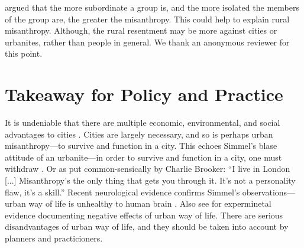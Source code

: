 \documentclass[11pt, letterpaper]{article}
\begin{document}
\begin{spacing}{1.4}
{
\citet{smith97} argued that the more subordinate a group is, and the more
isolated the members of the group are, the greater the misanthropy. %
 This could help to explain rural misanthropy.  Although, the rural resentment may be more against
  cities or urbanites, rather than people in general. We thank an anonymous reviewer for this point. %
}





\section*{Takeaway for Policy and Practice}

It is undeniable that there are multiple economic, environmental, and social
advantages to cities%
. 
 Cities are largely
 necessary, and so is perhaps urban misanthropy---to survive and function in a city.
 This echoes Simmel's blase attitude of an urbanite---in order to survive and function in a
 city, one must withdraw \citep{simmel03}. Or as put common-sensically by Charlie Brooker:
 ``I live in London [...] Misanthropy's the only thing that gets you
  through it. It's not a personality flaw, it's a skill.''
 Recent neurological evidence confirms
 Simmel's observations---urban way of life is unhealthy to human brain
 \citep{lederbogen11}. Also see \citet{milgram70} for experminetal evidence
 documenting negative effects of urban way of life. There are serious
 disandvantages of urban way of life, and they should be taken into account by
 planners and practicioners. %
 



\end{spacing}
\end{document}
